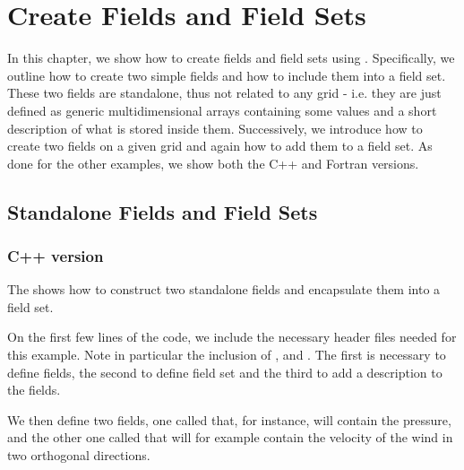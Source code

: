 \chapter{Create Fields and Field Sets}
In this chapter, we show how to create fields and field sets
using \Atlas. Specifically, we outline how to create two simple 
fields and how to include them into a field set. These two fields
are standalone, thus not related to any grid - i.e. they are just 
defined as generic multidimensional arrays containing some values 
and a short description of what is stored inside them.
Successively, we introduce how to create two fields on a given 
grid and again how to add them to a field set.
As done for the other examples, we show both the C++ and Fortran 
versions.


\section{Standalone Fields and Field Sets}
\label{sect:standalone-fields}

\subsection{C++ version}
The  shows how to construct two standalone 
fields and encapsulate them into a field set. 
%

%
On the first few lines of the code, we include the necessary 
\Atlas header files needed for this example. Note in particular 
the inclusion of ,  and 
. The first is necessary to define fields, 
the second to define field set and the third to add a description 
to the fields.

We then define two fields, one called  that, 
for instance, will contain the pressure, and the other one called 
 that will for example contain the velocity of 
the wind in two orthogonal directions.

